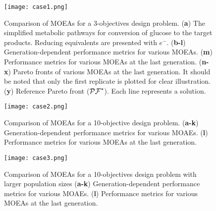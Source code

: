 {\begin{figure}[H]
    \centering
    \texttt{[image: case1.png]}
    \caption[Comparison of MOEAs for a 3-objectives design problem]{Comparison of MOEAs for a 3-objectives design problem.
	(\textbf{a}) The simplified metabolic pathways for conversion of glucose to the target products. Reducing equivalents are presented with $e^-$.
	(\textbf{b-l}) Generation-dependent performance metrics for various MOEAs.
	(\textbf{m}) Performance metrics for various MOEAs at the last generation.
	(\textbf{n-x}) Pareto fronts of various MOEAs at the last generation. It should be noted that only the first replicate is plotted for clear illustration.
	(\textbf{y}) Reference Pareto front ($\mathcal{PF}^*$). Each line represents a solution.}
    \label{fig4:case1}
\end{figure}
%

\begin{figure}[H]
    \centering
    \texttt{[image: case2.png]}
    \caption[Comparison of MOEAs for a 10-objective design problem]{Comparison of MOEAs for a 10-objective design problem. (\textbf{a-k}) Generation-dependent performance metrics for various MOAEs. (\textbf{l}) Performance metrics for various MOEAs at the last generation.}
\label{fig4:case2}
\end{figure}

\begin{figure}[H]
    \centering
    \texttt{[image: case3.png]}
    \caption[Comparison of MOEAs with increased population sizes]{Comparison of MOEAs for a 10-objectives design problem with larger population sizes
	(\textbf{a-k}) Generation-dependent performance metrics for various MOAEs.	(\textbf{l}) Performance metrics for various MOEAs at the last generation.}
\label{fig4:case3}
\end{figure}

}
